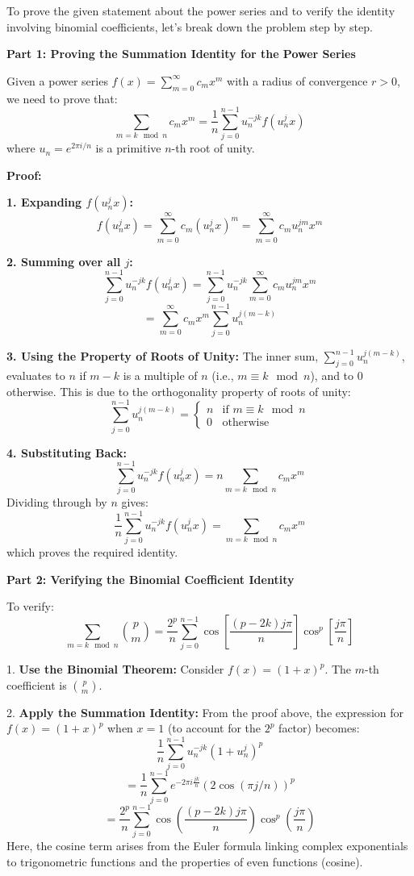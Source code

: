 \documentclass[8pt]{article}
\begin{document}
To prove the given statement about the power series and to verify the identity involving binomial coefficients, let's break down the problem step by step.

\textbf{Part 1: Proving the Summation Identity for the Power Series}

Given a power series \( f(x) = \sum_{m=0}^{\infty} c_m x^m \) with a radius of convergence \( r > 0 \), we need to prove that:
\[
\sum_{m = k \mod n} c_m x^m = \frac{1}{n} \sum_{j=0}^{n-1} u_n^{-jk} f(u_n^j x)
\]
where \( u_n = e^{2\pi i/n} \) is a primitive \( n \)-th root of unity.

\textbf{Proof:}

\textbf{1. Expanding \( f(u_n^j x) \):}
   \[
   f(u_n^j x) = \sum_{m=0}^{\infty} c_m (u_n^j x)^m = \sum_{m=0}^{\infty} c_m u_n^{jm} x^m
   \]

\textbf{2. Summing over all \( j \):}
   \[
   \sum_{j=0}^{n-1} u_n^{-jk} f(u_n^j x) = \sum_{j=0}^{n-1} u_n^{-jk} \sum_{m=0}^{\infty} c_m u_n^{jm} x^m
   \]
   \[
   = \sum_{m=0}^{\infty} c_m x^m \sum_{j=0}^{n-1} u_n^{j(m-k)}
   \]

\textbf{3. Using the Property of Roots of Unity:}
   The inner sum, \(\sum_{j=0}^{n-1} u_n^{j(m-k)}\), evaluates to \( n \) if \( m-k \) is a multiple of \( n \) (i.e., \( m \equiv k \mod n \)), and to 0 otherwise. This is due to the orthogonality property of roots of unity:
   \[
   \sum_{j=0}^{n-1} u_n^{j(m-k)} = \begin{cases}
   n & \text{if } m \equiv k \mod n \\
   0 & \text{otherwise}
   \end{cases}
   \]

\textbf{4. Substituting Back:}
   \[
   \sum_{j=0}^{n-1} u_n^{-jk} f(u_n^j x) = n \sum_{m = k \mod n} c_m x^m
   \]
   Dividing through by \( n \) gives:
   \[
   \frac{1}{n} \sum_{j=0}^{n-1} u_n^{-jk} f(u_n^j x) = \sum_{m = k \mod n} c_m x^m
   \]
   which proves the required identity.

\textbf{Part 2: Verifying the Binomial Coefficient Identity}

To verify:
\[
\sum_{m = k \mod n} \binom{p}{m} = \frac{2^p}{n} \sum_{j=0}^{n-1} \cos \left[ \frac{(p - 2k)j\pi}{n} \right] \cos^p \left[ \frac{j\pi}{n} \right]
\]

1. \textbf{Use the Binomial Theorem:}
   Consider \( f(x) = (1 + x)^p \). The \( m \)-th coefficient is \( \binom{p}{m} \).

2. \textbf{Apply the Summation Identity:}
   From the proof above, the expression for \( f(x) = (1 + x)^p \) when \( x = 1 \) (to account for the \( 2^p \) factor) becomes:
   \[
   \frac{1}{n} \sum_{j=0}^{n-1} u_n^{-jk} (1 + u_n^j)^p
   \]
   \[
   = \frac{1}{n} \sum_{j=0}^{n-1} e^{-2\pi i \frac{jk}{n}} (2 \cos(\pi j/n))^p
   \]
   \[
   = \frac{2^p}{n} \sum_{j=0}^{n-1} \cos \left(\frac{(p - 2k)j\pi}{n}\right) \cos^p \left(\frac{j\pi}{n}\right)
   \]
   Here, the cosine term arises from the Euler formula linking complex exponentials to trigonometric functions and the properties of even functions (cosine).
\end{document}
